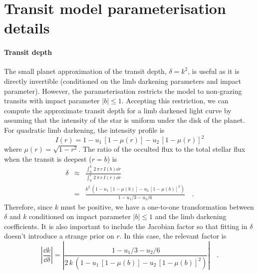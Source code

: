 \documentclass[floatfix,ApJL,twocolumn]{aastex631}
\begin{document}
\section{Transit model parameterisation details}\label{apdx:model_details}

\paragraph{Transit depth}
The small planet approximation of the transit depth, $\delta=k^2$, is useful as it is directly invertible (conditioned on the limb darkening parameters and impact parameter).
However, the parameterisation restricts the model to non-grazing transits with impact parameter $|b| \le 1$.
Accepting this restriction, we can compute the approximate transit depth for a limb darkened light curve by assuming that the intensity of the star is uniform under the disk of the planet.
For quadratic limb darkening, the intensity profile is
\begin{equation}
  I(r) = 1 - u_1\,[1 - \mu(r)] - u_2\,[1 - \mu(r)]^2
\end{equation}
where $\mu(r) = \sqrt{1 - r^2}$.
The ratio of the occulted flux to the total stellar flux when the transit is deepest ($r = b$) is \citep[the same results are discussed by][]{Mandel:2002,Csizmadia:2013, Agol:2020:AJ}
\begin{eqnarray}
  \delta &\approx& \frac{\int_0^k\,2\,\pi\,r\,I(b)\dd r}{\int_0^1\,2\,\pi\,r\,I(r)\dd r} \nonumber\\
  &=& \frac{k^2\,\left(1 - u_1\,[1 - \mu(b)] - u_2\,[1 - \mu(b)]^2\right)}{1 - u_1/3 - u_2/6}\quad.
\end{eqnarray}
Therefore, since $k$ must be positive, we have a one-to-one transformation between $\delta$ and $k$ conditioned on impact parameter $|b| \le 1$ and the limb darkening coefficients.
It is also important to include the Jacobian factor so that fitting in $\delta$ doesn't introduce a strange prior on $r$.
In this case, the relevant factor is
\begin{equation}
  \left|\frac{\dd k}{\dd \delta}\right| = \left|\frac{1 - u_1/3 - u_2/6}{2\,k\,\left(1 - u_1\,[1 - \mu(b)] - u_2\,[1 - \mu(b)]^2\right)}\right| \quad.
\end{equation}
\end{document}
